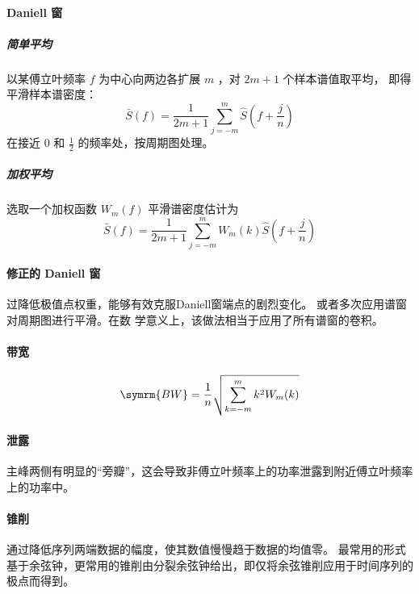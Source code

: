 \documentclass[UTF8,hyperref,a4paper,twoside]{ctexart}
\begin{document}
        \paragraph{Daniell 窗} 
        \subparagraph{简单平均} 以某傅立叶频率 $ f $ 为中心向两边各扩展 $ m $ ，对 $ 2m + 1 $ 个样本谱值取平均，
        即得平滑样本谱密度：
        $$ \bar{S}(f) = \frac{1}{2m+1} \sum_{j=-m}^{m} \hat{S}(f+\frac{j}{n}) $$
        在接近 $ 0 $ 和 $ \frac{1}{2} $ 的频率处，按周期图处理。
        \subparagraph{加权平均} 选取一个加权函数 $ W_m(f) $ 平滑谱密度估计为
        $$ \bar{S}(f) = \frac{1}{2m+1} \sum_{j=-m}^{m} W_m(k) \hat{S}(f+\frac{j}{n}) $$

        \paragraph{修正的 Daniell 窗} 过降低极值点权重，能够有效克服Daniell窗端点的剧烈变化。
        或者多次应用谱窗对周期图进行平滑。在数 学意义上，该做法相当于应用了所有谱窗的卷积。

        \paragraph{带宽} $$ \symrm{BW} = \frac{1}{n} \sqrt{\sum_{k=-m}^{m} k^2 W_m(k)} $$

        \paragraph{泄露} 主峰两侧有明显的“旁瓣”，这会导致非傅立叶频率上的功率泄露到附近傅立叶频率上的功率中。

        \paragraph{锥削} 通过降低序列两端数据的幅度，使其数值慢慢趋于数据的均值零。 
        最常用的形式基于余弦钟，更常用的锥削由分裂余弦钟给出，即仅将余弦锥削应用于时间序列的极点而得到。

        

    
\end{document}
